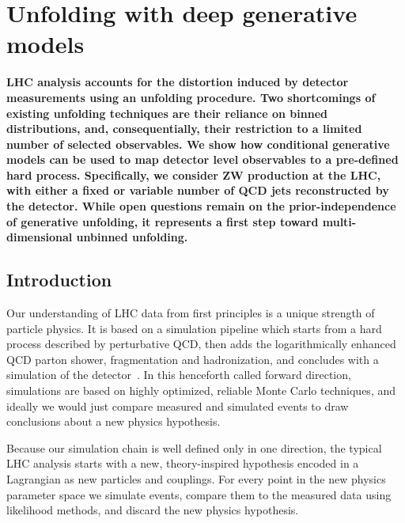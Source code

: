 %
%
%

\chapter{Unfolding with deep generative models}\label{chap:unfolding}
\enlargethispage{2ex}
\vspace*{-2pt}

\enlargethispage{2ex}

{\bf LHC analysis accounts for the distortion induced by detector measurements using an unfolding procedure. Two shortcomings of existing unfolding techniques are their reliance on binned distributions, and, consequentially, their restriction to a limited number of selected observables. We show how conditional generative models can be used to map detector level observables to a pre-defined hard process. Specifically, we consider ZW production at the LHC, with either a fixed or variable number of QCD jets reconstructed by the detector. While open questions remain on the prior-independence of generative unfolding, it represents a first step toward multi-dimensional unbinned unfolding.}
  
\section{Introduction}
\label{sec:ganintro}

Our understanding of LHC data from first principles is a unique
strength of particle physics. It is based on a simulation pipeline which
starts from a hard process described by perturbative QCD, then
adds the logarithmically enhanced QCD parton shower, fragmentation
and hadronization, and concludes with a simulation of the detector~\cite{black_book}. 
In this henceforth called forward direction, simulations are based on 
highly optimized, reliable Monte Carlo techniques, and ideally we would 
just compare measured and simulated events to draw conclusions about a
new physics hypothesis.

Because our simulation chain is well defined only in one direction, the typical
LHC analysis starts with a new, theory-inspired hypothesis encoded in
a Lagrangian as new particles and couplings. For every point in the
new physics parameter space we simulate events, compare them to the
measured data using likelihood methods, and discard the new physics
hypothesis. 

